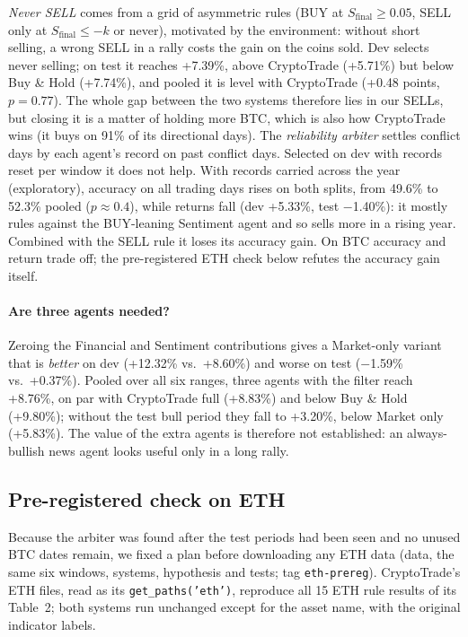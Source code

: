 \documentclass[11pt]{article}
\newcommand{\Sfinal}{S_{\text{final}}}
\begin{document}
\emph{Never SELL} comes from a grid of asymmetric rules (BUY at $\Sfinal\ge0.05$, SELL only at $\Sfinal\le-k$ or never),
motivated by the environment: without short selling, a wrong SELL in a rally costs the gain on the coins sold. Dev
selects never selling; on test it reaches +7.39\%, above CryptoTrade (+5.71\%) but below Buy \& Hold (+7.74\%), and
pooled it is level with CryptoTrade (+0.48 points, $p=0.77$). The whole gap between the two systems therefore lies in
our SELLs, but closing it is a matter of holding more BTC, which is also how CryptoTrade wins (it buys on 91\% of its
directional days). The \emph{reliability arbiter} settles conflict days by each agent's record on past conflict days.
Selected on dev with records reset per window it does not help. With records carried across the year (exploratory),
accuracy on all trading days rises on both splits, from 49.6\% to 52.3\% pooled ($p\approx0.4$), while returns fall
(dev +5.33\%, test $-$1.40\%): it mostly rules against the BUY-leaning Sentiment agent and so sells more in a rising year.
Combined with the SELL rule it loses its accuracy gain. On BTC accuracy and return trade off; the pre-registered ETH
check below refutes the accuracy gain itself.

\paragraph{Are three agents needed?} Zeroing the Financial and Sentiment contributions gives a Market-only variant that
is \emph{better} on dev (+12.32\% vs.\ +8.60\%) and worse on test ($-$1.59\% vs.\ +0.37\%). Pooled over all six ranges,
three agents with the filter reach +8.76\%, on par with CryptoTrade full (+8.83\%) and below Buy \& Hold (+9.80\%);
without the test bull period they fall to +3.20\%, below Market only (+5.83\%). The value of the extra agents is
therefore not established: an always-bullish news agent looks useful only in a long rally.

\subsection{Pre-registered check on ETH}
\label{sec:eth}
Because the arbiter was found after the test periods had been seen and no unused BTC dates remain, we fixed a plan before
downloading any ETH data (data, the same six windows, systems, hypothesis and tests; tag \texttt{eth-prereg}).
CryptoTrade's ETH files, read as its \texttt{get\_paths('eth')}, reproduce all 15 ETH rule results of its Table~2; both
systems run unchanged except for the asset name, with the original indicator labels.
\end{document}
